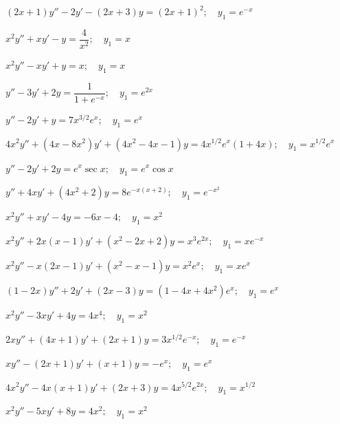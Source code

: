 \begin{exerciselist}

\item\label{exer:5.6.1}$(2x+1)y''-2y'-(2x+3)y=(2x+1)^2;  \quad y_1=e^{-x}$

\item\label{exer:5.6.2}$x^2y''+xy'-y=\dfrac{4}{x^2};   \quad y_1=x$

\item\label{exer:5.6.3}$x^2y''-xy'+y=x;   \quad y_1=x$

\item\label{exer:5.6.4}$y''-3y'+2y=\dfrac{1}{1+e^{-x}};   \quad y_1=e^{2x}$

\item\label{exer:5.6.5}$y''-2y'+y=7x^{3/2}e^x;   \quad y_1=e^x$

\item\label{exer:5.6.6}$4x^2y''+(4x-8x^2)y'+(4x^2-4x-1)y=4x^{1/2}e^x(1+4x);   \quad
y_1=x^{1/2}e^x$

\item\label{exer:5.6.7}$y''-2y'+2y=e^x\sec x;   \quad y_1=e^x\cos x$

\item\label{exer:5.6.8}$y''+4xy'+(4x^2+2)y=8e^{-x(x+2)};   \quad y_1=e^{-x^2}$

\item\label{exer:5.6.9}$x^2y''+xy'-4y=-6x-4;  \quad y_1=x^2$

\item\label{exer:5.6.10}$x^2y''+2x(x-1)y'+(x^2-2x+2)y=x^3e^{2x};   \quad y_1=xe^{-x}$

\item\label{exer:5.6.11}$x^2y''-x(2x-1)y'+(x^2-x-1)y=x^2e^x;  \quad y_1=xe^x$

\item\label{exer:5.6.12}$(1-2x)y''+2y'+(2x-3)y=(1-4x+4x^2)e^x;  \quad y_1=e^x$

\item\label{exer:5.6.13}$x^2y''-3xy'+4y=4x^4;  \quad y_1=x^2$

\item\label{exer:5.6.14}$2xy''+(4x+1)y'+(2x+1)y=3x^{1/2}e^{-x};  \quad y_1=e^{-x}$

\item\label{exer:5.6.15}$xy''-(2x+1)y'+(x+1)y=-e^x;  \quad y_1=e^x$

\item\label{exer:5.6.16}$4x^2y''-4x(x+1)y'+(2x+3)y=4x^{5/2}e^{2x};  \quad y_1=x^{1/2}$

\item\label{exer:5.6.17}$x^2y''-5xy'+8y=4x^2;  \quad y_1=x^2$


\end{exerciselist}

